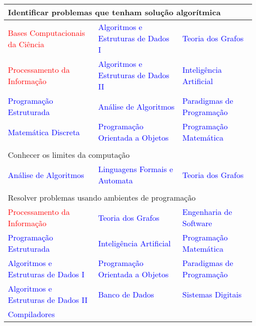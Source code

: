 \begin{longtable}{|p{}p{}p{}|}
	\multicolumn{3}{l}{Identificar problemas que tenham solução algorítmica}\\
	\hline
	\textcolor{red}{Bases Computacionais da Ciência}  & \textcolor{blue}{Algoritmos e Estruturas de Dados I} & \textcolor{blue}{Teoria dos Grafos}\\
	\textcolor{red}{Processamento da Informação} & \textcolor{blue}{Algoritmos e Estruturas de Dados II} & \textcolor{blue}{Inteligência Artificial}\\
	\textcolor{blue}{Programação Estruturada} & \textcolor{blue}{Análise de Algoritmos} & \textcolor{blue}{Paradigmas de Programação}\\
	\textcolor{blue}{Matemática Discreta} & \textcolor{blue}{Programação Orientada a Objetos} & \textcolor{blue}{Programação Matemática}\\
	\hline
	
	\multicolumn{3}{l}{}\\
	
	\multicolumn{3}{l}{Conhecer os limites da computação}\\
	\hline
	\textcolor{blue}{Análise de Algoritmos} & \textcolor{blue}{Linguagens Formais e Automata} & \textcolor{blue}{Teoria dos Grafos}\\
	\hline
	
	\multicolumn{3}{l}{}\\
	\multicolumn{3}{l}{Resolver problemas usando ambientes de programação}\\
	\hline
	\textcolor{red}{Processamento da Informação} &  \textcolor{blue}{Teoria dos Grafos} & \textcolor{blue}{Engenharia de Software}\\
	\textcolor{blue}{Programação Estruturada} &  \textcolor{blue}{Inteligência Artificial} &  \textcolor{blue}{Programação Matemática}\\
	\textcolor{blue}{Algoritmos e Estruturas de Dados I} & \textcolor{blue}{Programação Orientada a Objetos} & \textcolor{blue}{Paradigmas de Programação}\\
	\textcolor{blue}{Algoritmos e Estruturas de Dados II} & \textcolor{blue}{Banco de Dados} &  \textcolor{blue}{Sistemas Digitais}\\
	\textcolor{blue}{Compiladores} && \\
	\hline
	

\end{longtable}
